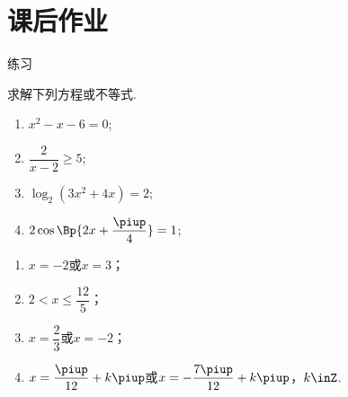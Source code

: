 \section{课后作业}
  \begin{exercise}{\heiti 练习}
    \item 求解下列方程或不等式.
      \begin{multicols}{2}\begin{enumerate}[label=\arabic*)]
          \item $x^2-x-6=0$;
          \vspace{2cm}
          \item $\dfrac2{x-2}\geqslant5$;
          \vspace{2cm}
          \item $\log_2(3x^2+4x)=2$;
          \vspace{2cm}
          \item $2\cos\Bp{2x+\dfrac{\piup}4}=1$;
          \vspace{2cm}
        \end{enumerate}
      \end{multicols}
      \begin{answer}
        \begin{enumerate}[itemindent=1em,listparindent=6em, label=\arabic*)]
          \item $x=-2$或$x=3$；
          \item $2<x\leqslant\dfrac{12}5$；
          \item $x=\dfrac23$或$x=-2$；
          \item $x=\dfrac{\piup}{12}+k\piup$或$x=-\dfrac{7\piup}{12}+k\piup$，$k\inZ$.
        \end{enumerate}
      \end{answer}
    \vspace{4em}
  \end{exercise}
